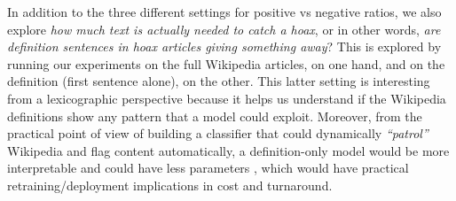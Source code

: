 In addition to the three different settings for positive vs negative ratios, we also explore \textit{how much text is actually needed to catch a hoax}, or in other words, \textit{are definition sentences in hoax articles giving something away}? This is explored by running our experiments on the full Wikipedia articles, on one hand, and on the definition (first sentence alone), on the other. This latter setting is interesting from a lexicographic perspective because it helps us understand if the Wikipedia definitions show any pattern that a model could exploit. Moreover, from the practical point of view of building a classifier that could dynamically \emph{``patrol''} Wikipedia and flag content automatically, a definition-only model would be more interpretable  and could have less parameters , which would have practical retraining/deployment implications in cost and turnaround. 
